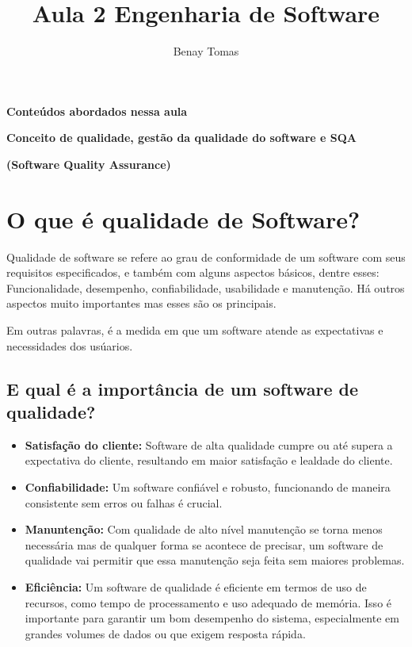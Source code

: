 \documentclass{article}
\title{Aula 2 Engenharia de Software}
\author{Benay Tomas}
\begin{document}
\selectfont

\maketitle

\thispagestyle{empty}

\textbf{Conteúdos abordados nessa aula}

\textbf{Conceito de qualidade, gestão da qualidade do software e SQA} 

\textbf{(Software Quality Assurance)}

\section{O que é qualidade de Software?}

Qualidade de software se refere ao grau de conformidade
de um software com seus requisitos especificados, e também
com alguns aspectos básicos, dentre esses:
Funcionalidade, desempenho, confiabilidade, usabilidade e manutenção.
Há outros aspectos muito importantes mas esses são os principais.

Em outras palavras, é  a medida em que um software
atende as expectativas e necessidades dos usúarios.

\subsection*{E qual é a importância de um software de qualidade?}

\begin{itemize}
    \item \textbf{Satisfação do cliente:} Software de alta qualidade
    cumpre ou até supera a expectativa do cliente, resultando
    em maior satisfação e lealdade do cliente.
    \item  \textbf{Confiabilidade:} Um software confiável e robusto, 
    funcionando de maneira consistente sem erros ou falhas é crucial.
    \item \textbf{Manuntenção:} Com qualidade de alto nível manutenção
    se torna menos necessária mas de qualquer forma se acontece de precisar,
    um software de qualidade vai permitir que essa manutenção seja feita sem
    maiores problemas. 
    \item \textbf{Eficiência:} Um software de qualidade é eficiente
    em termos de uso de recursos, como tempo de processamento e uso adequado de memória.
    Isso é importante para garantir um bom desempenho do sistema, especialmente
    em grandes volumes de dados ou que exigem resposta rápida.
\end{itemize}
\end{document}
